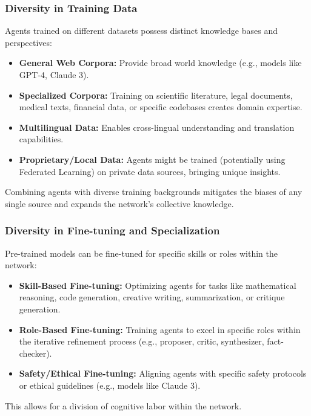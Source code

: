 \documentclass[12pt]{amsart}
\begin{document}
\subsubsection{Diversity in Training Data}
Agents trained on different datasets possess distinct knowledge bases and perspectives:
\begin{itemize}[leftmargin=*]
    \item \textbf{General Web Corpora:} Provide broad world knowledge (e.g., models like GPT-4, Claude 3).
    \item \textbf{Specialized Corpora:} Training on scientific literature, legal documents, medical texts, financial data, or specific codebases creates domain expertise.
    \item \textbf{Multilingual Data:} Enables cross-lingual understanding and translation capabilities.
    \item \textbf{Proprietary/Local Data:} Agents might be trained (potentially using Federated Learning) on private data sources, bringing unique insights.
\end{itemize}
Combining agents with diverse training backgrounds mitigates the biases of any single source and expands the network's collective knowledge.

\subsubsection{Diversity in Fine-tuning and Specialization}
Pre-trained models can be fine-tuned for specific skills or roles within the network:
\begin{itemize}[leftmargin=*]
    \item \textbf{Skill-Based Fine-tuning:} Optimizing agents for tasks like mathematical reasoning, code generation, creative writing, summarization, or critique generation.
    \item \textbf{Role-Based Fine-tuning:} Training agents to excel in specific roles within the iterative refinement process (e.g., proposer, critic, synthesizer, fact-checker).
    \item \textbf{Safety/Ethical Fine-tuning:} Aligning agents with specific safety protocols or ethical guidelines (e.g., models like Claude 3).
\end{itemize}
This allows for a division of cognitive labor within the network.
\end{document}
